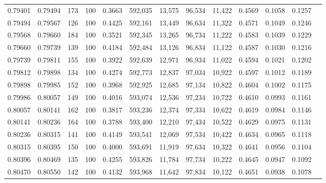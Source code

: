 \begin{tabular}{rrrrrrrrrrrrr}
0.79401 & 0.79494 &   173 & 100 &                                     0.3663 & 592,035 &  13,575 &  96,534 &  11,422 & 0.4569 & 0.1058 & 0.1257 \\
0.79494 & 0.79567 &   126 & 100 &                                     0.4425 & 592,161 &  13,449 &  96,634 &  11,322 & 0.4571 & 0.1049 & 0.1246 \\
0.79568 & 0.79660 &   184 & 100 &                                     0.3521 & 592,345 &  13,265 &  96,734 &  11,222 & 0.4583 & 0.1039 & 0.1229 \\
0.79660 & 0.79739 &   139 & 100 &                                     0.4184 & 592,484 &  13,126 &  96,834 &  11,122 & 0.4587 & 0.1030 & 0.1216 \\
0.79739 & 0.79811 &   155 & 100 &                                     0.3922 & 592,639 &  12,971 &  96,934 &  11,022 & 0.4594 & 0.1021 & 0.1202 \\
0.79812 & 0.79898 &   134 & 100 &                                     0.4274 & 592,773 &  12,837 &  97,034 &  10,922 & 0.4597 & 0.1012 & 0.1189 \\
0.79898 & 0.79985 &   152 & 100 &                                     0.3968 & 592,925 &  12,685 &  97,134 &  10,822 & 0.4604 & 0.1002 & 0.1175 \\
0.79986 & 0.80057 &   149 & 100 &                                     0.4016 & 593,074 &  12,536 &  97,234 &  10,722 & 0.4610 & 0.0993 & 0.1161 \\
0.80057 & 0.80141 &   162 & 100 &                                     0.3817 & 593,236 &  12,374 &  97,334 &  10,622 & 0.4619 & 0.0984 & 0.1146 \\
0.80141 & 0.80236 &   164 & 100 &                                     0.3788 & 593,400 &  12,210 &  97,434 &  10,522 & 0.4629 & 0.0975 & 0.1131 \\
0.80236 & 0.80315 &   141 & 100 &                                     0.4149 & 593,541 &  12,069 &  97,534 &  10,422 & 0.4634 & 0.0965 & 0.1118 \\
0.80315 & 0.80395 &   150 & 100 &                                     0.4000 & 593,691 &  11,919 &  97,634 &  10,322 & 0.4641 & 0.0956 & 0.1104 \\
0.80396 & 0.80469 &   135 & 100 &                                     0.4255 & 593,826 &  11,784 &  97,734 &  10,222 & 0.4645 & 0.0947 & 0.1092 \\
0.80470 & 0.80550 &   142 & 100 &                                     0.4132 & 593,968 &  11,642 &  97,834 &  10,122 & 0.4651 & 0.0938 & 0.1078 \\

\end{tabular}
